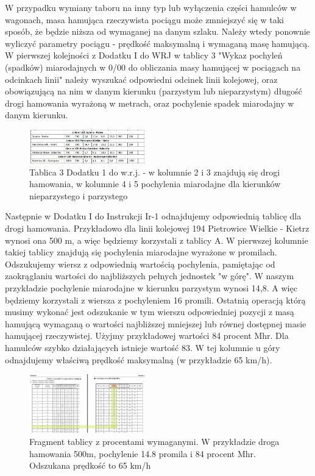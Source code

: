 W przypadku wymiany taboru na inny typ lub wyłączenia części hamulców w wagonach, masa hamująca rzeczywista pociągu może zmniejszyć się w taki sposób, że będzie niższa od wymaganej na danym szlaku. Należy wtedy ponownie wyliczyć parametry pociągu - prędkość maksymalną i wymaganą masę hamującą. 
W pierwszej kolejności z Dodatku I do WRJ w tablicy 3 "Wykaz pochyleń (spadków) miarodajnych w 0/00 do obliczania masy hamującej w pociągach na odcinkach linii" należy wyszukać odpowiedni odcinek linii kolejowej, oraz obowiązującą na nim w danym kierunku (parzystym lub nieparzystym) długość drogi hamowania wyrażoną w metrach, oraz pochylenie spadek miarodajny w danym kierunku.
\begin{figure}
	\includegraphics[width=0.45\textwidth]{skryptkierownik-img/tabela-d1-warunki.jpg}
	\caption{Tablica 3 Dodatku 1 do w.r.j. - w kolumnie 2 i 3 znajdują się drogi hamowania, w kolumnie 4 i 5 pochylenia miarodajne dla kierunków nieparzystego i parzystego}
\end{figure}
Następnie w Dodatku I do Instrukcji Ir-1 odnajdujemy odpowiednią tablicę dla drogi hamowania. Przykładowo dla linii kolejowej 194 Pietrowice Wielkie - Kietrz wynosi ona 500 m, a więc będziemy korzystali z tablicy A. W pierwszej kolumnie takiej tablicy znajdują się pochylenia miarodajne wyrażone w promilach. Odszukujemy wiersz z odpowiednią wartością pochylenia, pamiętając od zaokrąglaniu wartości do najbliższych pełnych jednostek "w górę". W naszym przykładzie pochylenie miarodajne w kierunku parzystym wynosi 14,8. A więc będziemy korzystali z wiersza z pochyleniem 16 promili.
Ostatnią operacją którą musimy wykonać jest odszukanie w tym wierszu odpowiedniej pozycji z masą hamującą wymaganą o wartości najbliższej mniejszej lub równej dostępnej masie hamującej rzeczywistej. Użyjmy przykładowej wartości 84 procent Mhr. Dla hamulców szybko działających istnieje wartość 83. W tej kolumnie u góry odnajdujemy właściwą prędkość maksymalną (w przykładzie 65 km/h).
\begin{figure}
	\includegraphics[width=0.45\textwidth]{skryptkierownik-img/tablica-ir1.jpg}
	\caption{Fragment tablicy z procentami wymaganymi. W przykładzie droga hamowania 500m, pochylenie 14.8 promila i 84 procent Mhr. Odszukana prędkość to 65 km/h}
\end{figure}
